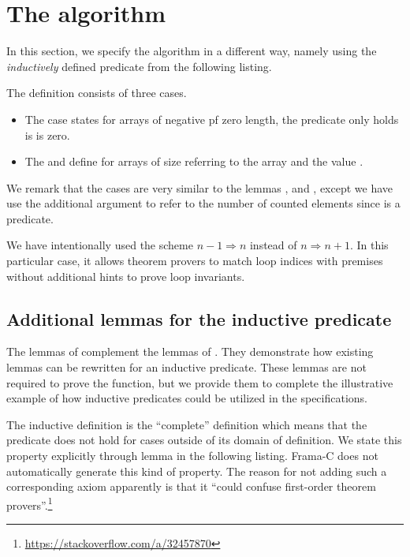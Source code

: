 
\section{The \countii algorithm}

In this section, we specify the \counti algorithm in a different way, namely
using the \emph{inductively} defined predicate
 from the
following listing.
%



The definition consists of three cases.
\begin{itemize}
\item
The  case states for arrays of negative pf zero length,
the predicate only holds is  is zero.

\item
The  and  define \CountInd for arrays 
of size  referring to the array  and the value .
\end{itemize}

We remark that the cases are very similar to the
lemmas ,
and ,
except we have use the additional argument  to refer to the number
of counted elements since \CountInd is a predicate.

We  have intentionally used the scheme $n-1 \Rightarrow n$ instead of $n \Rightarrow n+1$.
In this particular case, it allows theorem provers to match loop indices
with premises without additional hints to prove loop invariants.

\subsection{Additional lemmas for the inductive predicate}

The lemmas of 
complement the lemmas of .
They demonstrate how existing lemmas can be rewritten for an inductive predicate.
%
These lemmas are not required to prove the \counti function,
but we provide them to complete the illustrative example of how
inductive predicates could be utilized in the specifications.

The inductive definition is the ``complete'' definition
which means that the predicate does not hold for cases outside of its domain of definition.
We state this property explicitly through lemma
in the following listing.
Frama-C does not automatically generate this kind of property.
The reason for not adding such a corresponding axiom apparently is that it ``could
confuse first-order theorem provers''.\footnote{\url{https://stackoverflow.com/a/32457870}}

